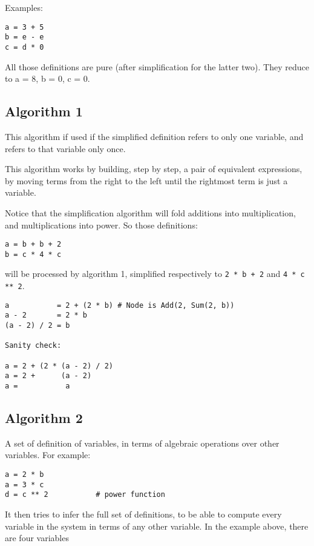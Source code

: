 \documentclass[11pt]{article}
\begin{document}
Examples:

\begin{verbatim}
a = 3 + 5
b = e - e
c = d * 0
\end{verbatim}

All those definitions are pure (after simplification for the latter
two).  They reduce to a = 8, b = 0, c = 0.
\subsection{Algorithm 1}
\label{sec:org513acd8}

This algorithm if used if the simplified definition refers to only one
variable, and refers to that variable only once.

This algorithm works by building, step by step, a pair of equivalent
expressions, by moving terms from the right to the left until the
rightmost term is just a variable.

Notice that the simplification algorithm will fold additions into
multiplication, and multiplications into power.  So those definitions:

\begin{verbatim}
a = b + b + 2
b = c * 4 * c
\end{verbatim}

will be processed by algorithm 1, simplified respectively to \texttt{2 * b + 2} and \texttt{4 * c ** 2}.


\begin{verbatim}
a           = 2 + (2 * b) # Node is Add(2, Sum(2, b))
a - 2       = 2 * b
(a - 2) / 2 = b

Sanity check:

a = 2 + (2 * (a - 2) / 2)
a = 2 +      (a - 2)
a =           a

\end{verbatim}
\subsection{Algorithm 2}
\label{sec:orgb19eb8c}



A set of definition of variables, in terms of algebraic operations
over other variables.  For example:

\begin{verbatim}
a = 2 * b
a = 3 * c
d = c ** 2           # power function
\end{verbatim}

It then tries to infer the full set of definitions, to be able to
compute every variable in the system in terms of any other
variable.  In the example above, there are four variables
\end{document}
